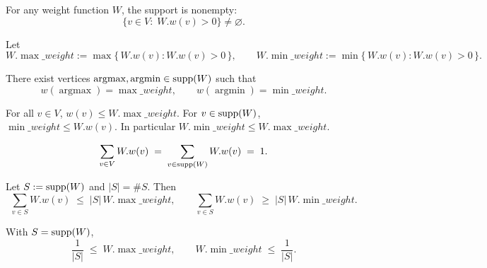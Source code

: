 \begin{lemma}\label{lem:supp-nonempty}
For any weight function \(W\), the support is nonempty:
\[
  \bigl\{v\in V:\; W.w(v)>0\bigr\}\neq\varnothing.
\]
\leanok
\end{lemma}

\begin{definition}\label{def:max-min-weight}
Let
\[
  W.\max\_weight := \max\{\,W.w(v): W.w(v)>0\,\},\qquad
  W.\min\_weight := \min\{\,W.w(v): W.w(v)>0\,\}.
\]
\leanok
\end{definition}

\begin{lemma}\label{lem:argmax-argmin}
There exist vertices \(\operatorname{argmax}, \operatorname{argmin}\in\operatorname{supp}(W)\) such that
\[
  w(\operatorname{argmax})=\max\_weight,\qquad
  w(\operatorname{argmin})=\min\_weight.
\]
\leanok
\end{lemma}

\begin{lemma}\label{lem:max-min-pointwise}
For all \(v\in V\),
\(w(v)\le W.\max\_weight\).
For \(v\in\operatorname{supp}(W)\),
\(\min\_weight\le W.w(v)\).
In particular \(W.\min\_weight\le W.\max\_weight\).
\leanok
\end{lemma}

\begin{lemma}\label{lem:sum-over-support-ones}
\[
  \sum_{v\in V} W.w(v) \;=\; \sum_{v\in\operatorname{supp}(W)} W.w(v) \;=\; 1.
\]
\leanok
\end{lemma}

\begin{lemma}\label{lem:support-sum-bounds}
Let \(S:=\operatorname{supp}(W)\) and \(|S|=\#S\). Then
\[
  \sum_{v\in S} W.w(v) \;\le\; |S|\, W.\max\_weight,
  \qquad
  \sum_{v\in S} W.w(v) \;\ge\; |S|\, W.\min\_weight.
\]
\leanok
\end{lemma}

\begin{lemma}\label{lem:avg-vs-extrema}
With \(S=\operatorname{supp}(W)\),
\[
  \frac{1}{|S|} \;\le\; W.\max\_weight,
  \qquad
  W.\min\_weight \;\le\; \frac{1}{|S|}.
\]
\leanok
\end{lemma}

